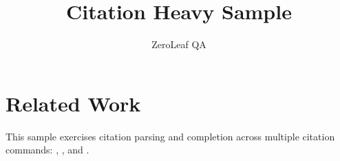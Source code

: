 \documentclass{article}
\title{Citation Heavy Sample}
\author{ZeroLeaf QA}
\begin{document}
\maketitle

\section{Related Work}
This sample exercises citation parsing and completion across multiple citation
commands: \citep{knuth1984,lamport1994}, \citet{mittelbach2004}, and
\cite{missing2026}.



\end{document}
